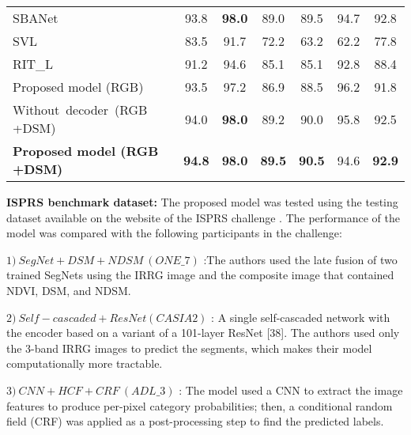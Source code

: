 \documentclass[journal]{IEEEtran}
\begin{document}
\begin{table*}[h!]
\begin{tabular}{lcccccc}
SBANet \cite{9345482}                       & 93.8                   & \textbf{98.0}      & 89.0                 & 89.5       & 94.7          & 92.8                                           \\
SVL \cite{rs10091429}                 & 83.5                   & 91.7               & 72.2                 & 63.2            & 62.2   & 77.8                                             \\
RIT\_L \cite{10.1117/12.2243169}                         & 91.2                     & 94.6                 & 85.1                  & 85.1             & 92.8           & 88.4                                             \\

Proposed model (RGB)            & 93.5                    & 97.2              & 86.9                  & 88.5             & 96.2          & 91.8                                           \\
Without~decoder~(RGB +DSM)       & 94.0                     & \textbf{98.0}        & 89.2                   & 90.0             & 95.8            & 92.5                                             \\
\textbf{Proposed model (RGB +DSM)} & \textbf{94.8}           & \textbf{98.0}        & \textbf{89.5}          & \textbf{90.5}    & 94.6           & \textbf{92.9}                           \\
\hline
\end{tabular}
\label{table:4}
\end{table*}
\textbf{ISPRS benchmark dataset:} The proposed model was tested using the testing dataset available on the website of the ISPRS challenge \cite{labeling_2016}. The performance of the model was compared with the following participants in the challenge:

$1)~ SegNet+DSM+NDSM ~(ONE\_7)$ \cite{AUDEBERT201820}:The authors used the late fusion of two trained SegNets using the IRRG image and the composite image that contained NDVI, DSM, and NDSM.

$2)	~Self-cascaded+ResNet (CASIA2)$ \cite{LIU201878}: A single self-cascaded network with the encoder based on a variant of a 101-layer ResNet [38]. The authors used only the 3-band IRRG images to predict the segments, which makes their model computationally more tractable. 

$3)	~CNN+HCF+CRF ~(ADL\_3)$ \cite{Peng_2017_CVPR} : The model used a CNN to extract the image features to produce per-pixel category probabilities; then, a conditional random field (CRF) was applied as a post-processing step to find the predicted labels.
\end{document}
